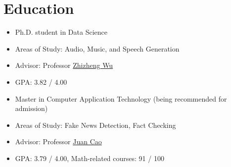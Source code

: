 \documentclass{resume}
\begin{document}




\section{Education}
{
  \small
  \begin{itemize}
    \item Ph.D. student in Data Science
    \item Areas of Study: Audio, Music, and Speech Generation
    \item Advisor: Professor
          \href{https://scholar.google.com/citations?user=K6zhweAAAAAJ&hl=en}{Zhizheng
            Wu}
    \item GPA: 3.82 / 4.00
  \end{itemize}
}

{
  \small
  \begin{itemize}
    \item Master in Computer Application Technology (being recommended for admission)
    \item Areas of Study: Fake News Detection, Fact Checking
    \item Advisor: Professor
          \href{https://scholar.google.com/citations?user=fSBdNg0AAAAJ&hl=zh-CN}{Juan
            Cao}
    \item GPA: 3.79 / 4.00, Math-related courses: 91 / 100
  \end{itemize}
}
\end{document}
